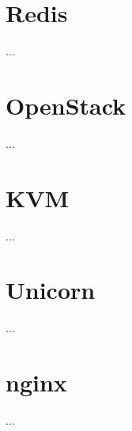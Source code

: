 \section{Redis}\label{sec:ch3/sect5}
...

\section{OpenStack}\label{sec:ch3/sect6}
...

\section{KVM}\label{sec:ch3/sect7}
...

\section{Unicorn}\label{sec:ch3/sect8}
...

\section{nginx}\label{sec:ch3/sect9}
...


